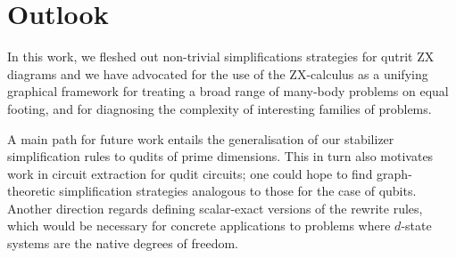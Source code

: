 \section{Outlook}

In this work, we fleshed out non-trivial simplifications strategies for qutrit ZX diagrams
and
we have advocated for the use of the ZX-calculus
as a unifying graphical framework for treating a broad range of many-body problems on equal footing, and for diagnosing the complexity of interesting families of problems.


A main path for future work entails the generalisation
of our stabilizer simplification rules to qudits of prime dimensions.
This in turn also motivates work in circuit extraction \cite{backens2020again} for qudit circuits; one could hope to find graph-theoretic simplification \cite{graph_theoretic_simplification} strategies analogous to those for the case of qubits.
Another direction regards defining scalar-exact versions of the rewrite rules, which would be necessary for concrete applications to problems where $d$-state systems are the native degrees of freedom.
